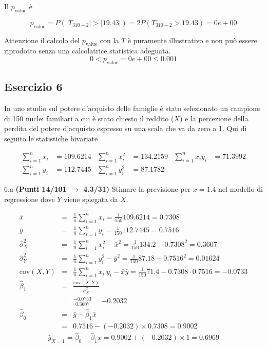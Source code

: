 \documentclass[
  11pt,
]{book}
\theoremstyle{mytheoremstyle}
\theoremstyle{mydefstyle}
\newenvironment{sol}
  {
  \begin{tcolorbox}[enhanced,breakable,arc=0.1mm,boxrule=1pt,colback=white,colframe=iblue,
  title=\bf \fontfamily{lmss}\selectfont \hspace{.5 cm} Soluzione,drop fuzzy shadow]

}{
\end{tcolorbox}
  }
\begin{document}
\begin{sol}
Il \(p_{\text{value}}\) è

\[ p_{\text{value}} = P(|T_{310-2}|>|19.43|)=2P(T_{310-2}>19.43)=0e+00 \]

Attenzione il calcolo del \(p_\text{value}\) con la \(T\) è puramente illustrativo e non può essere riprodotto senza una calcolatrice statistica adeguata.\[
 0 < p_\text{value}= 0e+00 \leq 0.001 
\]

\end{sol}

\subsection{Esercizio 6}\label{esercizio-6-10}

In uno studio sul potere d'acquisto delle famiglie è stato selezionato un campione di 150 nuclei familiari
a cui è stato chiesto il reddito (\(X\)) e la percezione della perdita del potere d'acquisto espresso su una scala che va da zero a 1.
Qui di seguito le statistiche bivariate

\begin{align*}
  \sum_{i=1}^n x_i &= 109.6214 &\sum_{i=1}^n x_i^2 &= 134.2159 &\sum_{i=1}^n x_i y_i &= 71.3992\\
  \sum_{i=1}^n y_i &= 112.7445 & \sum_{i=1}^n y_i^2 &= 87.1782 &
\end{align*}

6.a \textbf{(Punti 14/101 \(\rightarrow\) 4.3/31)} Stimare la previsione per \(x=1.4\) nel modello di regressione dove \(Y\) viene spiegata da \(X\).

\begin{sol}
\begin{eqnarray*}
           \bar x &=&\frac 1 n\sum_{i=1}^n x_i = \frac {1}{ 150 }  109.6214 =  0.7308 \\
           \bar y &=&\frac 1 n\sum_{i=1}^n y_i = \frac {1}{ 150 }  112.7445 =  0.7516 \\
           \hat\sigma_X^2&=&\frac 1 n\sum_{i=1}^n x_i^2-\bar x^2=\frac {1}{ 150 }  134.2  - 0.7308 ^2= 0.3607 \\
           \hat\sigma_Y^2&=&\frac 1 n\sum_{i=1}^n y_i^2-\bar y^2=\frac {1}{ 150 }  87.18  - 0.7516 ^2= 0.01624 \\
           \text{cov}(X,Y)&=&\frac 1 n\sum_{i=1}^n x_i~y_i-\bar x\bar y=\frac {1}{ 150 }  71.4 - 0.7308 \cdot 0.7516 = -0.0733 \\
           \hat\beta_1 &=& \frac{\text{cov}(X,Y)}{\hat\sigma_X^2} \\
                    &=& \frac{ -0.0733 }{ 0.3607 }  =  -0.2032 \\
           \hat\beta_0 &=& \bar y - \hat\beta_1 \bar x\\
                    &=&  0.7516 - (-0.2032) \times  0.7308 = 0.9002 
         \end{eqnarray*}\[\hat y_{X= 1 }=\hat\beta_0+\hat\beta_1 x= 0.9002 + (-0.2032) \times 1 = 0.6969 \]

\end{sol}
\end{document}
